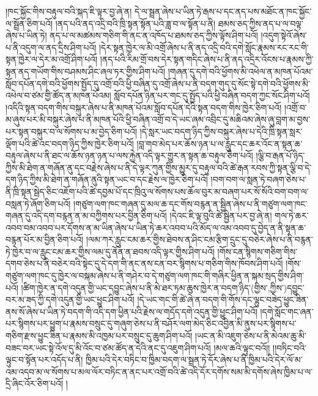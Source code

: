 །ཁང་སྐྱོང་གིས་བརྟུལ་བའི་སྐད་ཇི་ལྟར་བྱ་ཞེ་ན། དེ་ལ་སྦྲན་ཞེས་པ་ཡིན་ཏེ་རྒས་པ་དང་ནད་པས་མཐོང་ན་ཁང་སྐྱོང་ལ་སྦྲོན་ཅིག་པའོ། །ནད་པའི་ནད་འདྲི་བའི་ཁྲི་སྟན་སྟོན་པའི་ཟླ་བ་ལ་སྟོན་པ་ནི། ཐམས་ཅད་ཀྱིས་ནད་པ་ལ་བལྟ་ཞེས་པ་ཡིན་ཏེ། ནད་པ་ལ་མཚམས་གཅིག་གི་ནང་ན་འཁོད་པ་ཐམས་ཅད་ཀྱིས་ལྟོས་ཤིག་པའོ། །འདུག་སྟེའོ་ཞེས་པ་ནི་འདུག་ལ་ནད་དྲིས་ཤིག་པའོ། །དེར་སྟན་ཁྱེར་ལ་མི་འགྲོ་ཞེས་པ་ནི་ནད་འདྲི་བའི་དགེ་སློང་རྣམས་རང་རང་གི་སྟན་ཁྱེར་ལ་དེར་མ་འགྲོ་ཤིག་པའོ། །ནད་པའི་རིམ་གྲོ་བས་དེར་སྟན་གདིང་ཞེས་པ་ནི་ནད་འདྲིར་འོངས་པ་རྣམས་ཀྱི་སྟན་ནད་གཡོག་གིས་བཤམས་ཤིང་ཞལ་ཏར་གྱིས་ཤིག་པའོ། །གཞན་དུ་དགེ་བའི་ཕྱོགས་མི་འཕེལ་ན་མཁན་པོའམ་སློབ་དཔོན་དགེ་བའི་ཕྱོགས་སྤྱོད་དུ་འགྲོ་བའི་ཕྱི་བཞིན་དུ་འགྲོ་ཞེས་པ་ནི་བདག་གུད་དུ་སོང་སྟེ་དགེ་བའི་ཕྱོགས་མི་འཕེལ་བ་ཙམ་གྱི་ཚོད་ན་མཁན་པོའམ། སློབ་དཔོན་ཉིན་པར་གང་དུ་སྤྱོད་པའི་ཕྱི་བཞིན་བདག་ཀྱང་སོང་ཤིག་པའོ། །འདིའི་སྟན་བདག་གིས་བསྐུར་ཞེས་པ་ནི་མཁན་པོའམ་སློབ་དཔོན་དེའི་སྟན་བདག་གིས་ཁྱེར་ཅིག་པའོ། །འགྲོ་བ་མ་ཞུས་པར་མི་བསྐུར་ཞེས་པ་ནི་མཁན་པོའི་ཕྱི་བཞིན་འགྲོ་བ་དེ་ཡང་ཞམ་འབྲིང་དུ་མཆིའམ་ཞེས་ཞུ་བླག་མ་བྱས་པར་སྟན་བསྐུར་བ་ལ་སོགས་པ་མ་བྱེད་ཅིག་པའོ། །དེ་སླར་ཡང་བདག་ཉིད་ཀྱིས་བསྐུར་ཞེས་པ་དེའི་ཁྲི་སྟན་སླར་ལྡོག་པའི་ཚེ་འང་བདག་ཉིད་ཀྱིས་ཁྱེར་ཅིག་པའོ། །བླ་གབ་མེད་པར་ཆོས་ཉན་པ་ལ་རླུང་དང་ཆར་འོང་ན་སྟན་ཆ་བརྟུལ་ཞེས་པ་ནི་ཐང་ལ་ཆོས་ཉན་ཉན་པ་ལས་རྐྱེན་འདི་ལྟར་གྱུར་ན་སྟན་ཆ་བརྟུལ་ཅིག་པའོ། །ལྕི་བ་རྒན་པོ་ཉིད་ཀྱིས་མི་ཐེག་ན་གཞོན་ནུ་དང་བརྗེས་ཞེས་པ་ནི་དེ་ལྟར་ཀུན་གྱིས་མྱུར་དུ་བརྟུལ་བའི་ཚེ་རྒན་རབས་ཀྱི་སྟན་ལྕི་བ་དེ་དག་ཉིད་ཀྱིས་མི་ཐེག་ན་གཞོན་ནུའི་སྟན་ཡང་བ་དང་རྗེས་ལ་ཁྱེར་ཅིག་པའོ། །བག་བག་ལ་སླན་ཏེ་བཞག་ཅེས་པ་ནི་ཁྲི་སྟན་སྦེད་ཅིང་འཇོག་པའི་ཚེ་དབྱམ་པོ་དང་ཁྲིའུ་ལ་སོགས་པས་ཆོལ་བུར་མ་བཞག་པར་སོ་སོའི་བག་བག་ལ་བསླན་ཏེ་ཞོག་ཅིག་པའོ། །གཙུག་ལག་ཁང་གཞན་དུ་མལ་ཆ་དང་གོས་བརྙན་ན་སྦྱིན་ཞེས་པ་ནི་གཙུག་ལག་ཁང་གཞན་དུ་འདི་དག་བརྙན་ན་མ་བཀྱིགས་པར་བྱིན་ཅིག་པའོ། །དེའང་ཇི་ལྟ་བུའི་ཚེ་སྦྱིན་པར་བྱ་ཞེ་ན། གལ་ཏེ་ཆར་འབབ་བམ་འབབ་པར་དོགས་ན་མ་ཡིན་ཞེས་པ་ཡིན་ཏེ་ཆར་འབབ་པའི་མོད་ལ་འམ་འབབ་དུ་བྱེད་ན་ནི་སྟན་ཆ་བརྙན་པོར་མ་བྱིན་ཅིག་པའོ། །ལམ་ཀར་རླུང་ངམ་ཆར་གྱིས་ཐེབས་ན་ཤིང་ངམ་རྩིག་དྲུང་དུ་བཅེར་ཞེས་པ་ནི་བརྙན་ཏེ་ཁྱེར་བ་ལ་རླུང་ངམ་ཆར་གྱིས་ལམ་དུ་ནོན་ན་ཐབས་འདི་ལྟར་གྱིས་ཤིག་པའོ། །གོས་ངན་སྙིགས་གཅིག་གིས་དགབ་ཅེས་པ་ནི་བཅེར་བའི་སྟེང་དུ་དེ་དག་གི་ནང་ནས་ངན་བར་སྙིགས་པ་གཅིག་གིས་ཁོབས་ཤིག་པའོ། །གོས་གཙུག་ལག་ཁང་དུ་ཁྱེར་ལ་བསྐམ་ཞེས་པ་ནི་གཤེར་བ་དེ་གཙུག་ལག་ཁང་གི་གཞིར་ཕྱིན་ན་སྐམ་སྲད་གྱིས་ཤིག་པའོ། །ཚིག་ཁྱེར་ན་དགེ་འདུན་གྱི་ཡང་དབྱུང་ཞེས་པ་ནི་མེ་ཐར་ཏམ་ཆུས་ཁྱེར་ན་བདག་ཉིད་(གྱིས་‚ཀྱིས་)དབྱུང་བར་མ་ཟད་ཀྱི་དགེ་འདུན་གྱི་ཡང་ཕྱུང་ཤིག་པའོ། །དེ་ཡང་གང་གི་ཚེ་ཞེ་ན་བདག་གི་གོས་དང་ལྷུང་བཟེད་ཕྱུང་ཟིན་ནས་སོ་ཞེས་པ་ཡིན་ཏེ་བདག་གི་འདི་དག་ཕྱིན་པའི་རྗེས་ལ་གདོད་དགེ་འདུན་གྱི་ཕྱུང་ཤིག་པའོ། །དགེ་སློང་གང་ཞན་པར་སྙིགས་པར་ཕྱུག་པ་རྣམས་བསྲུང་དུ་གཞུག་ཅེས་པ་ནི་བཤོར་ལག་མེད་ཅིང་འབྱིན་མི་ནུས་པར་སྙིགས་པ་གཅིག་རྫས་ཕྱུང་ཟིན་པ་རྣམས་མི་འཁྱམ་པར་བསྲུང་དུ་ཆུག་ཤིག་པའོ། །ཡང་ན་མི་འཇུག་ཅེས་པ་ནི་མེའམ་ཆུ་མི་བཟང་བར་ཡང་སྟེ་འོལ་དུ་མི་འོང་བ་ཙམ་ཚོད་ན་དེའི་ནང་དུ་འཇུག་ཤིག་པའོ། །མལ་ཆའི་ལྟུང་བའོ།། །།བཏིང་བའི་ལྟུང་བ་སྟོན་པར་འདོད་པ་ནི། ཁྱིམ་པའི་དེར་བཏིང་བ་ཁྱིམ་བདག་ལ་སྦྲན་ཏེ་དོར་ཞེས་པ་ནི་ཁྱིམ་པའི་དེར་ལོ་མ་འམ་འདབ་མ་ལ་སོགས་པ་མལ་ལོར་བཏིང་ན་ནང་པར་འགྲོ་བའི་ཚེ་འདི་དོར་དགོས་སམ་མི་དགོས་ཞེས་ཁྱིམ་པ་ལ་དྲི་ཞིང་འོར་ཅིག་པའོ། །
